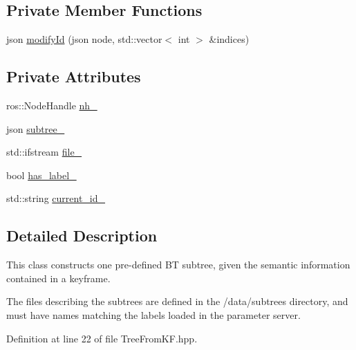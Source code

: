 \subsection*{Private Member Functions}
\begin{DoxyCompactItemize}
\item 
json \hyperlink{classtree__generator_1_1SubTreeFromKF_aea29705cc665f48d15ee436a409d55a9_aea29705cc665f48d15ee436a409d55a9}{modify\-Id} (json node, std\-::vector$<$ int $>$ \&indices)
\end{DoxyCompactItemize}
\subsection*{Private Attributes}
\begin{DoxyCompactItemize}
\item 
ros\-::\-Node\-Handle \hyperlink{classtree__generator_1_1SubTreeFromKF_af32fafef64d1f98df5b38697d1984d80_af32fafef64d1f98df5b38697d1984d80}{nh\-\_\-}
\item 
json \hyperlink{classtree__generator_1_1SubTreeFromKF_a2c9edbe4a6243a1a8bad6ae524df884b_a2c9edbe4a6243a1a8bad6ae524df884b}{subtree\-\_\-}
\item 
std\-::ifstream \hyperlink{classtree__generator_1_1SubTreeFromKF_a66c16669fa438a7a923a88557f8c9654_a66c16669fa438a7a923a88557f8c9654}{file\-\_\-}
\item 
bool \hyperlink{classtree__generator_1_1SubTreeFromKF_abf3280300d7972d36344adf0196d6aba_abf3280300d7972d36344adf0196d6aba}{has\-\_\-label\-\_\-}
\item 
std\-::string \hyperlink{classtree__generator_1_1SubTreeFromKF_a93cab044cd81910fd6b22522e7aa12a6_a93cab044cd81910fd6b22522e7aa12a6}{current\-\_\-id\-\_\-}
\end{DoxyCompactItemize}


\subsection{Detailed Description}
This class constructs one pre-\/defined B\-T subtree, given the semantic information contained in a keyframe.

The files describing the subtrees are defined in the /data/subtrees directory, and must have names matching the labels loaded in the parameter server. 

Definition at line 22 of file Tree\-From\-K\-F.\-hpp.



